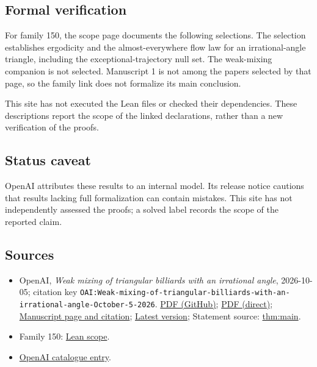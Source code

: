 \documentclass[11pt]{article}
\begin{document}
\subsection{Formal verification}
For family 150, the scope page documents the following selections. The selection establishes ergodicity and the almost-everywhere flow law for an irrational-angle triangle, including the exceptional-trajectory null set. The weak-mixing companion is not selected. Manuscript 1 is not among the papers selected by that page, so the family link does not formalize its main conclusion.

This site has not executed the Lean files or checked their dependencies. These descriptions report the scope of the linked declarations, rather than a new verification of the proofs.

\subsection{Status caveat}
OpenAI attributes these results to an internal model. Its release notice cautions that results lacking full formalization can contain mistakes. This site has not independently assessed the proofs; a solved label records the scope of the reported claim.

\subsection{Sources}
\begin{itemize}
\item OpenAI, \emph{Weak mixing of triangular billiards with an irrational angle}, 2026-10-05; citation key \texttt{OAI:Weak-mixing-of-triangular-billiards-with-an-irrational-angle-October-5-2026}. \href{https://github.com/openai/math/blob/adc7f1241b42e322a6451854ab7e4b4c146bf78a/preprints/Weak-mixing-of-triangular-billiards-with-an-irrational-angle-October-5-2026/weak-mixing-triangular-billiards.pdf}{PDF (GitHub)}; \href{https://github.com/openai/math/raw/adc7f1241b42e322a6451854ab7e4b4c146bf78a/preprints/Weak-mixing-of-triangular-billiards-with-an-irrational-angle-October-5-2026/weak-mixing-triangular-billiards.pdf}{PDF (direct)}; \href{https://github.com/openai/math/blob/adc7f1241b42e322a6451854ab7e4b4c146bf78a/preprints/Weak-mixing-of-triangular-billiards-with-an-irrational-angle-October-5-2026/README.md}{Manuscript page and citation}; \href{https://github.com/openai/math/blob/main/preprints/Weak-mixing-of-triangular-billiards-with-an-irrational-angle-October-5-2026/weak-mixing-triangular-billiards.pdf}{Latest version}; Statement source: \href{https://github.com/openai/math/blob/adc7f1241b42e322a6451854ab7e4b4c146bf78a/preprints/Weak-mixing-of-triangular-billiards-with-an-irrational-angle-October-5-2026/build/sections/introduction.tex\#L16}{thm:main}.
\item Family 150: \href{https://github.com/openai/math/blob/adc7f1241b42e322a6451854ab7e4b4c146bf78a/lean/docs/150.md}{Lean scope}.
\item \href{https://github.com/openai/math/blob/adc7f1241b42e322a6451854ab7e4b4c146bf78a/CONTENTS.md}{OpenAI catalogue entry}.
\end{itemize}
\end{document}
